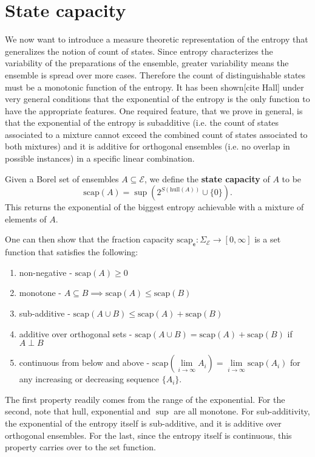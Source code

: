 \documentclass[10pt,twocolumn, nofootinbib]{revtex4-2}
\newcommand\hull{\mathrm{hull}}
\newcommand\capacity{\mathrm{scap}}
\newcommand{\ens}[1][e] {\mathsf{#1}} %
\newcommand{\Ens}[1][E] {\mathcal{#1}} %
\def\ortho{\perp}
\begin{document}
\section{State capacity}

We now want to introduce a measure theoretic representation of the entropy that generalizes the notion of count of states. Since entropy characterizes the variability of the preparations of the ensemble, greater variability means the ensemble is spread over more cases. Therefore the count of distinguishable states must be a monotonic function of the entropy. It has been shown[cite Hall] under very general conditions that the exponential of the entropy is the only function to have the appropriate features. One required feature, that we prove in general, is that the exponential of the entropy is subadditive (i.e. the count of states associated to a mixture cannot exceed the combined count of states associated to both mixtures) and it is additive for orthogonal ensembles (i.e. no overlap in possible instances) in a specific linear combination.

Given a Borel set of ensembles $A \subseteq \Ens$, we define the \textbf{state capacity} of $A$ to be
\begin{equation}
\capacity(A) = \sup(2^{S(\hull(A))}\cup\{0\}).
\end{equation}
This returns the exponential of the biggest entropy achievable with a mixture of elements of $A$.

One can then show that the fraction capacity $\capacity_{\ens} : \Sigma_{\Ens} \to [0,\infty]$ is a set function that satisfies the following:
\begin{enumerate}
	\item non-negative - $\capacity(A)\geq 0$
	\item monotone - $A \subseteq B \implies \capacity(A) \leq \capacity(B)$
	\item sub-additive - $\capacity(A \cup B) \leq \capacity(A) + \capacity(B)$
	\item additive over orthogonal sets - $\capacity(A \cup B) = \capacity(A) + \capacity(B)$ if $A \ortho B$
	\item continuous from below and above - $\capacity(\lim\limits_{i \to \infty} A_i) = \lim\limits_{i \to \infty} \capacity(A_i)$ for any increasing or decreasing sequence $\{A_i\}$.
\end{enumerate}

The first property readily comes from the range of the exponential. For the second, note that $\hull$, exponential and $\sup$ are all monotone. For sub-additivity, the exponential of the entropy itself is sub-additive, and it is additive over orthogonal ensembles. For the last, since the entropy itself  is continuous, this property carries over to the set function.
\end{document}
